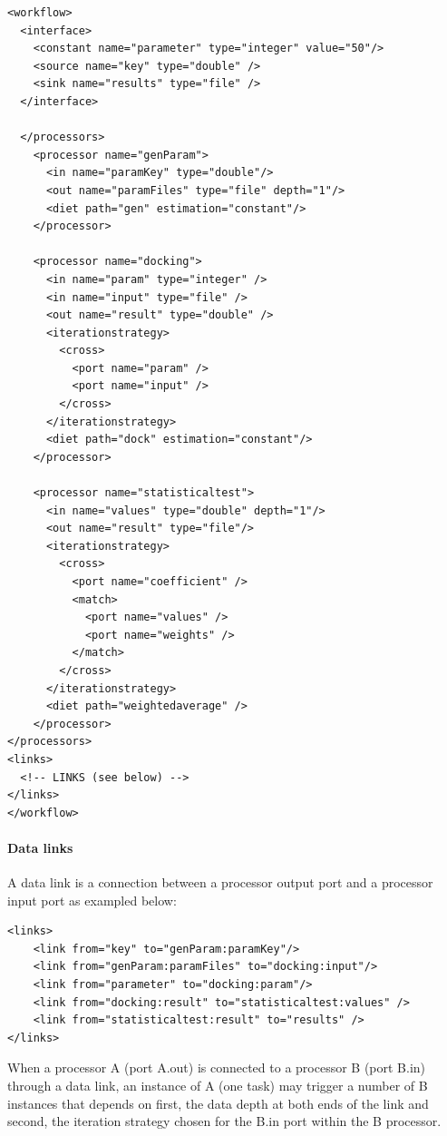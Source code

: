 \begin{verbatim}
<workflow>
  <interface>
    <constant name="parameter" type="integer" value="50"/>
    <source name="key" type="double" />
    <sink name="results" type="file" />
  </interface>

  </processors>
    <processor name="genParam">
      <in name="paramKey" type="double"/>
      <out name="paramFiles" type="file" depth="1"/>
      <diet path="gen" estimation="constant"/>
    </processor>

    <processor name="docking">
      <in name="param" type="integer" />
      <in name="input" type="file" />
      <out name="result" type="double" />
      <iterationstrategy>
        <cross>
          <port name="param" />
          <port name="input" />
        </cross>
      </iterationstrategy>
      <diet path="dock" estimation="constant"/>
    </processor>

    <processor name="statisticaltest">
      <in name="values" type="double" depth="1"/>
      <out name="result" type="file"/>
      <iterationstrategy>
        <cross>
          <port name="coefficient" />
          <match>
            <port name="values" />
            <port name="weights" />
          </match>
        </cross>
      </iterationstrategy>
      <diet path="weightedaverage" />
    </processor>
</processors>
<links>
  <!-- LINKS (see below) -->
</links>
</workflow>
\end{verbatim}\begin{itemize}

\paragraph{Data links} A data link is a connection between a processor output port and a processor input port as exampled below:
\begin{verbatim}
<links>
    <link from="key" to="genParam:paramKey"/>
    <link from="genParam:paramFiles" to="docking:input"/>
    <link from="parameter" to="docking:param"/>
    <link from="docking:result" to="statisticaltest:values" />
    <link from="statisticaltest:result" to="results" />
</links>
\end{verbatim}
When a processor A (port A.out) is connected to a processor B (port B.in) through a data link, an instance of A (one task) may trigger a number of B instances that depends on first, the data depth at both ends of the link and second, the iteration strategy chosen for the B.in port within the B processor.



\end{itemize}
